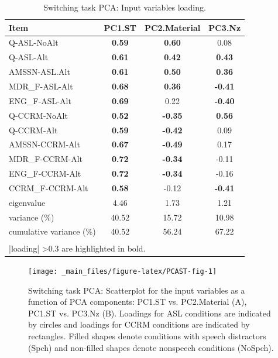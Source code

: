 \documentclass[a4paper, twoside]{templates/ociamthesis}
\begin{document}
\begin{table}

\caption{\label{tab:PCAST-Tab}Switching task PCA: Input variables loading.}
\centering
\begin{tabular}[t]{lccc}
\toprule
Item & PC1.ST & PC2.Material & PC3.Nz\\
\midrule
Q-ASL-NoAlt & \textbf{0.59} & \textbf{0.60} & 0.08\\
Q-ASL-Alt & \textbf{0.61} & \textbf{0.42} & \textbf{0.43}\\
AMSSN-ASL.Alt & \textbf{0.61} & \textbf{0.50} & \textbf{0.36}\\
MDR\_F-ASL-Alt & \textbf{0.68} & \textbf{0.36} & \textbf{-0.41}\\
ENG\_F-ASL-Alt & \textbf{0.69} & 0.22 & \textbf{-0.40}\\
Q-CCRM-NoAlt & \textbf{0.52} & \textbf{-0.35} & \textbf{0.56}\\
Q-CCRM-Alt & \textbf{0.59} & \textbf{-0.42} & 0.09\\
AMSSN-CCRM-Alt & \textbf{0.67} & \textbf{-0.49} & 0.17\\
MDR\_F-CCRM-Alt & \textbf{0.72} & \textbf{-0.34} & -0.11\\
ENG\_F-CCRM-Alt & \textbf{0.72} & \textbf{-0.34} & -0.16\\
CCRM\_F-CCRM-Alt & \textbf{0.58} & -0.12 & \textbf{-0.41}\\
\midrule
eigenvalue & 4.46 & 1.73 & 1.21\\
variance (\%) & 40.52 & 15.72 & 10.98\\
cumulative variance (\%) & 40.52 & 56.24 & 67.22\\
\bottomrule
\multicolumn{4}{l}{\textsuperscript{} |loading| >0.3 are highlighted in bold.}\\
\end{tabular}
\end{table}

\begin{figure}

{\centering \texttt{[image: \_main\_files/figure-latex/PCAST-fig-1]} 

}

\caption{Switching task PCA: Scatterplot for the input variables as a function of PCA components: PC1.ST vs. PC2.Material (A), PC1.ST vs. PC3.Nz (B). Loadings for ASL conditions are indicated by circles and loadings for CCRM conditions are indicated by rectangles. Filled shapes denote conditions with speech distractors (Spch) and non-filled shapes denote nonspeech conditions (NoSpch).}\label{fig:PCAST-fig}
\end{figure}
\end{document}
